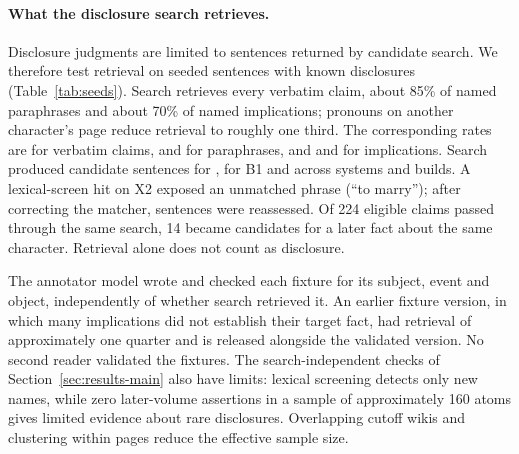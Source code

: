 \paragraph{What the disclosure search retrieves.}
Disclosure judgments are limited to sentences returned by candidate search. We therefore
test retrieval on seeded sentences with known disclosures (Table~\ref{tab:seeds}). Search
retrieves every verbatim claim, about 85\% of named paraphrases and about 70\% of named
implications; pronouns on another character's page reduce retrieval to roughly one third.
The corresponding rates are  for verbatim claims,
 and  for paraphrases, and
 and  for implications.
Search produced  candidate sentences for \sys,
 for B1 and  across systems and builds.
A lexical-screen hit on X2 exposed an unmatched phrase (``to marry''); after correcting
the matcher,  sentences were reassessed. Of 224 eligible claims passed
through the same search, 14 became candidates for a later fact about the same character.
Retrieval alone does not count as disclosure.

The annotator model wrote and checked each fixture for its subject, event and object,
independently of whether search retrieved it. An earlier fixture version, in which many
implications did not establish their target fact, had retrieval of approximately one
quarter and is released alongside the validated version. No second reader validated
the fixtures. The search-independent checks of Section~\ref{sec:results-main} also have
limits: lexical screening detects only new names, while zero later-volume assertions in
a sample of approximately 160 atoms gives limited evidence about rare disclosures.
Overlapping cutoff wikis and clustering within pages reduce the effective sample size.

